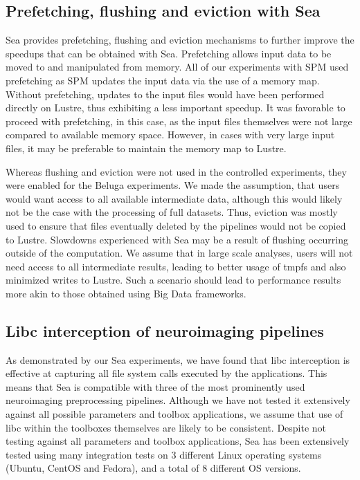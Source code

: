     \subsection{Prefetching, flushing and eviction with Sea}

    Sea provides prefetching, flushing and eviction mechanisms to further
    improve the speedups that can be obtained with Sea. Prefetching allows input
    data to be moved to and manipulated from memory. All of our experiments with
    SPM used prefetching as SPM updates the input data via the use of a memory
    map. Without prefetching, updates to the input files would have been
    performed directly on Lustre, thus exhibiting a less important speedup. It
    was favorable to proceed with prefetching, in this case, as the input files
    themselves were not large compared to available memory space. However, in
    cases with very large input files, it may be preferable to maintain the
    memory map to Lustre.

    Whereas flushing and eviction were not used in the controlled experiments,
    they were enabled for the Beluga experiments. We made the assumption, that 
    users would want access to all available intermediate data,
    although this would likely not be the case with the processing of full datasets.
    Thus, eviction was mostly used to ensure that files eventually deleted by
    the pipelines would not be copied to Lustre.
    Slowdowns experienced with Sea may be a result of flushing
    occurring outside of the computation. We assume that in large scale
    analyses, users will not need access to all intermediate results, leading to
    better usage of tmpfs and also minimized writes to Lustre. Such a scenario
    should lead to performance results more akin to those obtained using Big
    Data frameworks.

    \subsection{Libc interception of neuroimaging pipelines}
    
    As demonstrated by our Sea experiments, we have found that libc interception
    is effective at capturing all file system calls executed by the
    applications. This means that Sea is compatible with three of the most
    prominently used neuroimaging preprocessing pipelines. Although we have not
    tested it extensively against all possible parameters and toolbox
    applications, we assume that use of libc within the toolboxes themselves are
    likely to be consistent. Despite not testing against all parameters and
    toolbox applications, Sea has been extensively tested using many integration
    tests on 3 different Linux operating systems (Ubuntu, CentOS and Fedora),
    and a total of 8 different OS versions.

